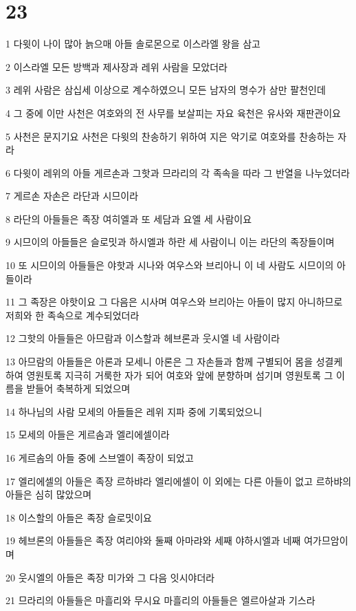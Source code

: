 \chapter{23}

\par 1 다윗이 나이 많아 늙으매 아들 솔로몬으로 이스라엘 왕을 삼고
\par 2 이스라엘 모든 방백과 제사장과 레위 사람을 모았더라
\par 3 레위 사람은 삼십세 이상으로 계수하였으니 모든 남자의 명수가 삼만 팔천인데
\par 4 그 중에 이만 사천은 여호와의 전 사무를 보살피는 자요 육천은 유사와 재판관이요
\par 5 사천은 문지기요 사천은 다윗의 찬송하기 위하여 지은 악기로 여호와를 찬송하는 자라
\par 6 다윗이 레위의 아들 게르손과 그핫과 므라리의 각 족속을 따라 그 반열을 나누었더라
\par 7 게르손 자손은 라단과 시므이라
\par 8 라단의 아들들은 족장 여히엘과 또 세담과 요엘 세 사람이요
\par 9 시므이의 아들들은 슬로밋과 하시엘과 하란 세 사람이니 이는 라단의 족장들이며
\par 10 또 시므이의 아들들은 야핫과 시나와 여우스와 브리아니 이 네 사람도 시므이의 아들이라
\par 11 그 족장은 야핫이요 그 다음은 시사며 여우스와 브리아는 아들이 많지 아니하므로 저희와 한 족속으로 계수되었더라
\par 12 그핫의 아들들은 아므람과 이스할과 헤브론과 웃시엘 네 사람이라
\par 13 아므람의 아들들은 아론과 모세니 아론은 그 자손들과 함께 구별되어 몸을 성결케 하여 영원토록 지극히 거룩한 자가 되어 여호와 앞에 분향하며 섬기며 영원토록 그 이름을 받들어 축복하게 되었으며
\par 14 하나님의 사람 모세의 아들들은 레위 지파 중에 기록되었으니
\par 15 모세의 아들은 게르솜과 엘리에셀이라
\par 16 게르솜의 아들 중에 스브엘이 족장이 되었고
\par 17 엘리에셀의 아들은 족장 르하뱌라 엘리에셀이 이 외에는 다른 아들이 없고 르하뱌의 아들은 심히 많았으며
\par 18 이스할의 아들은 족장 슬로밋이요
\par 19 헤브론의 아들들은 족장 여리야와 둘째 아마랴와 세째 야하시엘과 네째 여가므암이며
\par 20 웃시엘의 아들은 족장 미가와 그 다음 잇시야더라
\par 21 므라리의 아들들은 마흘리와 무시요 마흘리의 아들들은 엘르아살과 기스라
